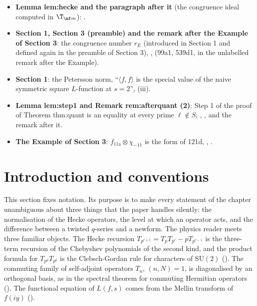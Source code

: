 \begin{itemize}
complement of $g^S$, idempotents of $\T_\ell$, the $\Z_\ell$-version of Lemma lem:crit for $\pi$, , , ,
, , . The theorem is proved in .
\item \textbf{Lemma lem:hecke and the paragraph after it} (the congruence ideal computed in $\T_{\mf m}$): .
\item \textbf{Section 1, Section 3 (preamble) and the remark after the Example of Section 3}: the congruence number $r_E$ (introduced in Section 1 and defined again in the
preamble of Section 3), ,  (99a1, 539d1, in the unlabelled remark after the Example).
\item \textbf{Section 1}: the Petersson norm, ``$\langle f,f\rangle$ is the special value of the naive symmetric square $L$-function at $s=2$'', (iii).
\item \textbf{Lemma lem:step1 and Remark rem:afterquant (2)}: Step 1 of the proof of Theorem thm:quant is an equality at every prime $\ell\notin S$; , ,
 and the remark after it.
\item \textbf{The Example of Section 3}: $f_{\text{11a}}\otimes\chi_{-11}$ is the form of 121d, , .
\end{itemize}

\section{Introduction and conventions}\label{sec:hecke:intro}

This section fixes notation. Its purpose is to make every statement of the chapter unambiguous about three things that the paper handles silently: the
normalisation of the Hecke operators, the level at which an operator acts, and the difference between a twisted $q$-series and a newform. The physics reader
meets three familiar objects. The Hecke recursion $T_{p^{r+1}}=T_pT_{p^r}-pT_{p^{r-1}}$ is the three-term recursion of the Chebyshev polynomials of the second kind,
and the product formula for $T_{p^a}T_{p^b}$ is the Clebsch-Gordan rule for characters of $\mathrm{SU}(2)$ (). The commuting family of
self-adjoint operators $T_n$, $(n,N)=1$, is diagonalised by an orthogonal basis, as in the spectral theorem for commuting Hermitian operators
(). The functional equation of $L(f,s)$ comes from the Mellin transform of $f(iy)$ ().

